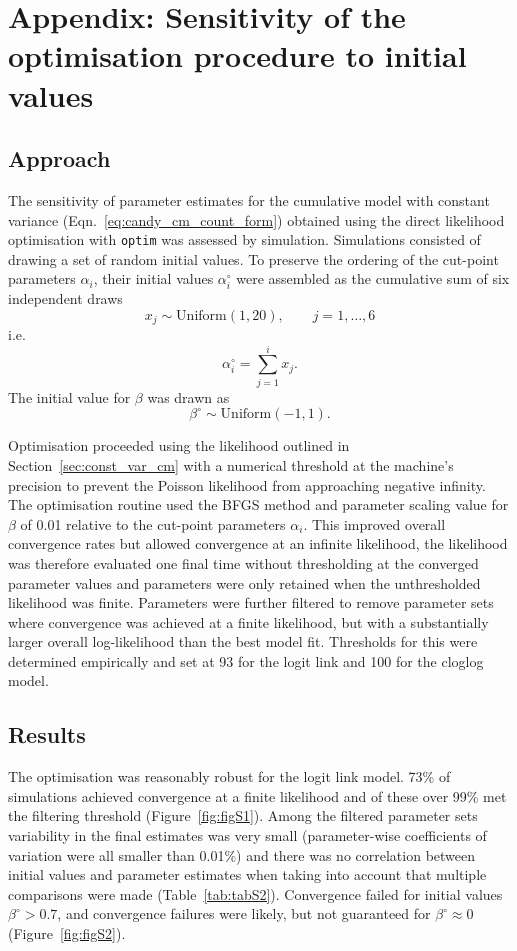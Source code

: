 \newpage
\appendix
\renewcommand\thefigure{S\arabic{figure}}    
\setcounter{figure}{0} 
\renewcommand\thetable{S\arabic{table}}    
\setcounter{table}{0}

\section{Appendix: Sensitivity of the optimisation procedure to initial values}
\subsection{Approach}
\label{sec:appendix}
The sensitivity of parameter estimates for the cumulative model with constant variance (Eqn.~\ref{eq:candy_cm_count_form}) obtained using the direct likelihood optimisation with \verb+optim+ was assessed by simulation.
Simulations consisted of drawing a set of random initial values. To preserve the ordering of the cut-point parameters $\alpha_i$, their initial values $\alpha^{\circ}_i$ were assembled as the cumulative sum of six independent draws $$x_j \sim \mathrm{Uniform}(1,20), \qquad j = 1,\ldots, 6$$ i.e. $$\alpha^{\circ}_i = \sum_{j=1}^i x_j.$$ The initial value for $\beta$ was drawn as $$\beta^{\circ}\sim\mathrm{Uniform}(-1,1).$$

Optimisation proceeded using the likelihood outlined in Section~\ref{sec:const_var_cm} with a numerical threshold at the machine's precision to prevent the Poisson likelihood from approaching negative infinity. The optimisation routine used the BFGS method and parameter scaling value for $\beta$ of 0.01 relative to the cut-point parameters $\alpha_i$. This improved overall convergence rates but allowed convergence at an infinite likelihood, the likelihood was therefore evaluated one final time without thresholding at the converged parameter values and parameters were only retained when the unthresholded likelihood was finite. 
Parameters were further filtered to remove parameter sets where convergence was achieved at a finite likelihood, but with a substantially larger overall log-likelihood than the best model fit. Thresholds for this were determined empirically and set at 93 for the logit link and 100 for the cloglog model.

\subsection{Results}
The optimisation was reasonably robust for the logit link model. 73\% of simulations achieved convergence at a finite likelihood and of these over 99\% met the filtering threshold (Figure~\ref{fig:figS1}). Among the filtered parameter sets variability in the final estimates was very small (para\-meter-wise coefficients of variation were all smaller than 0.01\%) and there was no correlation between initial values and parameter estimates when taking into account that multiple comparisons were made (Table~\ref{tab:tabS2}). Convergence failed for initial values $\beta^{\circ}>0.7$, and convergence failures were likely, but not guaranteed for $\beta^{\circ}\approx 0$ (Figure~\ref{fig:figS2}).

